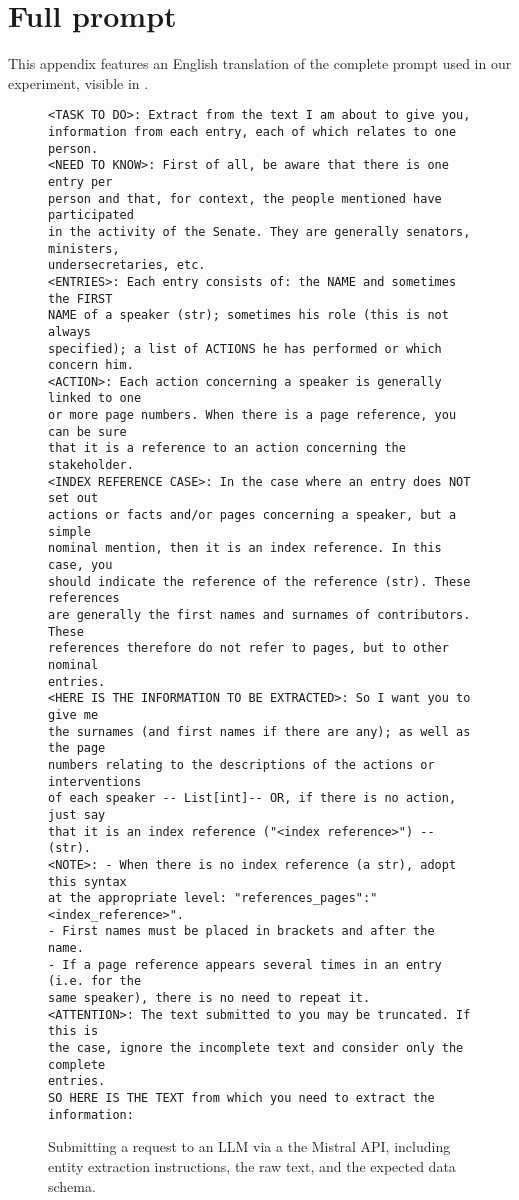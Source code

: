 \section{Full prompt} \label{appdx:full-prompt}
This appendix features an English translation of the complete prompt used in our experiment, visible in .
\begin{figure}[!h]
\begin{minipage}{\textwidth}
\small
\begin{verbatim}
<TASK TO DO>: Extract from the text I am about to give you,
information from each entry, each of which relates to one person.
<NEED TO KNOW>: First of all, be aware that there is one entry per
person and that, for context, the people mentioned have participated
in the activity of the Senate. They are generally senators, ministers,
undersecretaries, etc.
<ENTRIES>: Each entry consists of: the NAME and sometimes the FIRST
NAME of a speaker (str); sometimes his role (this is not always
specified); a list of ACTIONS he has performed or which concern him.
<ACTION>: Each action concerning a speaker is generally linked to one
or more page numbers. When there is a page reference, you can be sure
that it is a reference to an action concerning the stakeholder.
<INDEX REFERENCE CASE>: In the case where an entry does NOT set out
actions or facts and/or pages concerning a speaker, but a simple
nominal mention, then it is an index reference. In this case, you
should indicate the reference of the reference (str). These references
are generally the first names and surnames of contributors. These
references therefore do not refer to pages, but to other nominal
entries.
<HERE IS THE INFORMATION TO BE EXTRACTED>: So I want you to give me
the surnames (and first names if there are any); as well as the page
numbers relating to the descriptions of the actions or interventions
of each speaker -- List[int]-- OR, if there is no action, just say
that it is an index reference ("<index reference>") -- (str).
<NOTE>: - When there is no index reference (a str), adopt this syntax
at the appropriate level: "references_pages":"<index_reference>".
- First names must be placed in brackets and after the name.
- If a page reference appears several times in an entry (i.e. for the
same speaker), there is no need to repeat it.
<ATTENTION>: The text submitted to you may be truncated. If this is
the case, ignore the incomplete text and consider only the complete
entries.
SO HERE IS THE TEXT from which you need to extract the information:
\end{verbatim}
\end{minipage}
\caption{Submitting a request to an LLM via a the Mistral API, including entity extraction instructions, the raw text, and the expected data schema. }
\label{fig:full_prompt}
\end{figure}
